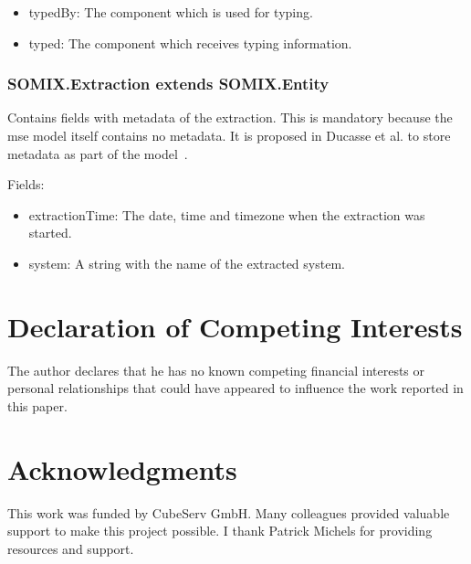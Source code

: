 \documentclass[preprint,12pt]{elsarticle}
\begin{document}
\begin{itemize}
\item typedBy: The component which is used for typing.
\item typed: The component which receives typing information.
\end{itemize}


\subsubsection{SOMIX.Extraction extends SOMIX.Entity}
Contains fields with metadata of the extraction. This is mandatory because the mse model itself contains no metadata. It is proposed in Ducasse et al. to store metadata as part of the model~\cite{r_Ducasse_2011}.

Fields:
\begin{itemize}
\item extractionTime: The date, time and timezone when the extraction was started.
\item system: A string with the name of the extracted system.
\end{itemize}


\section*{Declaration of Competing Interests} 
The author declares that he has no known competing financial interests or personal relationships that could have appeared to influence the work reported in this paper.

\section*{Acknowledgments}

This work was funded by CubeServ GmbH.
Many colleagues provided valuable support to make this project possible.
I thank
Patrick Michels for providing resources and support.
\end{document}
